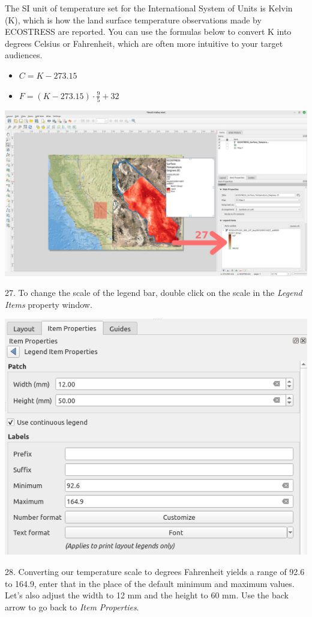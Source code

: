 \documentclass[oneside,a4paper,11pt,explicit]{book}
\begin{document}
The SI unit of temperature set for the International System of Units is Kelvin (K), which is how the land surface temperature observations made by ECOSTRESS are reported. You can use the formulas below to convert K into degrees Celsius or Fahrenheit, which are often more intuitive to your target audiences. 
\begin{itemize}
	\item $C = K - 273.15$
	\item $F = (K - 273.15) \cdot \frac{9}{5} + 32$
\end{itemize}

\centerline{\includegraphics[width=\textwidth]{TempScale1.png}}

27. To change the scale of the legend bar, double click on the scale in the \textit{Legend Items} property window.

\vspace{.25em}

\centerline{\includegraphics[width=.6\textwidth]{TempScale2.png}}

28. Converting our temperature scale to degrees Fahrenheit yields a range of 92.6 to 164.9, enter that in the place of the default minimum and maximum values. Let's also adjust the width to 12 mm and the height to 60 mm. Use the back arrow to go back to \textit{Item Properties}.
\end{document}

